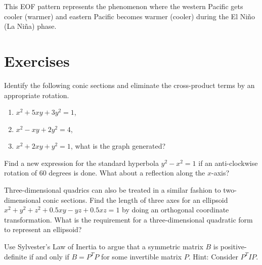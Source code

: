 This EOF pattern represents the  phenomenon where the western Pacific gets cooler (warmer) and eastern Pacific becomes warmer (cooler) during the El Niño (La Niña) phase.

\section{Exercises}

\begin{Exercise}
Identify the following conic sections and eliminate the cross-product terms by an appropriate rotation.
\begin{enumerate}[label=(\alph*)]
\item $x^2 + 5xy + 3y^2 = 1$,
\item $x^2 - xy + 2y^2 = 4$,
\item $x^2 + 2xy + y^2 = 1$, what is the graph generated? 
\end{enumerate}
\end{Exercise}

\begin{Exercise}
Find a new expression for the standard hyperbola $y^2 - x^2 = 1$ if an anti-clockwise rotation of $60$ degrees is done. What about a reflection along the $x$-axis?
\end{Exercise}

\begin{Exercise}
\label{ex:ellipsoid}
Three-dimensional quadrics can also be treated in a similar fashion to two-dimensional conic sections. Find the length of three axes for an ellipsoid $x^2 + y^2 + z^2 + 0.5xy - yz + 0.5xz = 1$ by doing an orthogonal coordinate transformation. What is the requirement for a three-dimensional quadratic form to represent an ellipsoid?
\end{Exercise}

\begin{Exercise}
\label{ex:sylvesterdefinite}
Use Sylvester's Law of Inertia to argue that a symmetric matrix $B$ is positive-definite if and only if $B = P^TP$ for some invertible matrix $P$. Hint: Consider $P^T IP$.
\end{Exercise}

